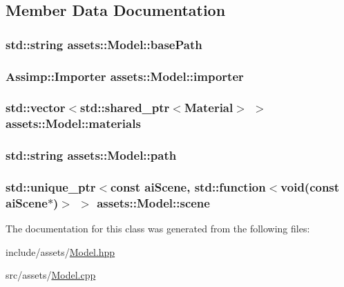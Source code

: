 \subsection{Member Data Documentation}
\hypertarget{classassets_1_1Model_a748cc83c4c91d8970a429752beb0434f}{
\subsubsection[{base\-Path}]{\setlength{\rightskip}{0pt plus 5cm}std\-::string assets\-::\-Model\-::base\-Path}}\label{classassets_1_1Model_a748cc83c4c91d8970a429752beb0434f}
\hypertarget{classassets_1_1Model_a1f2f5543520d08a386fcdf519ff65657}{
\subsubsection[{importer}]{\setlength{\rightskip}{0pt plus 5cm}Assimp\-::\-Importer assets\-::\-Model\-::importer}}\label{classassets_1_1Model_a1f2f5543520d08a386fcdf519ff65657}
\hypertarget{classassets_1_1Model_a75f9607e14e57f0795fdb1277f2a3ce4}{
\subsubsection[{materials}]{\setlength{\rightskip}{0pt plus 5cm}std\-::vector$<$std\-::shared\-\_\-ptr$<${\bf Material}$>$ $>$ assets\-::\-Model\-::materials}}\label{classassets_1_1Model_a75f9607e14e57f0795fdb1277f2a3ce4}
\hypertarget{classassets_1_1Model_a3b22bec082660e6c8d10080cf29f7f92}{
\subsubsection[{path}]{\setlength{\rightskip}{0pt plus 5cm}std\-::string assets\-::\-Model\-::path}}\label{classassets_1_1Model_a3b22bec082660e6c8d10080cf29f7f92}
\hypertarget{classassets_1_1Model_a1feb9354d61543c64e24dfdb159742a4}{
\subsubsection[{scene}]{\setlength{\rightskip}{0pt plus 5cm}std\-::unique\-\_\-ptr$<$const ai\-Scene, std\-::function$<$void(const ai\-Scene$\ast$)$>$ $>$ assets\-::\-Model\-::scene}}\label{classassets_1_1Model_a1feb9354d61543c64e24dfdb159742a4}


The documentation for this class was generated from the following files\-:\begin{DoxyCompactItemize}
\item 
include/assets/\hyperlink{Model_8hpp}{Model.\-hpp}\item 
src/assets/\hyperlink{Model_8cpp}{Model.\-cpp}\end{DoxyCompactItemize}
